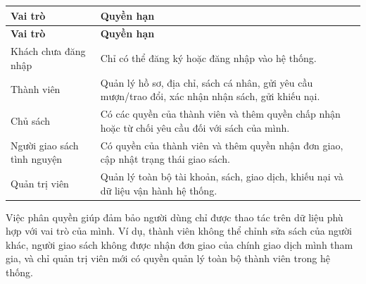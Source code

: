\begin{longtable}{L{0.28\textwidth}L{0.62\textwidth}}
    \toprule
    \textbf{Vai trò} & \textbf{Quyền hạn} \\
    \midrule
    \endfirsthead
    \toprule
    \textbf{Vai trò} & \textbf{Quyền hạn} \\
    \midrule
    \endhead
    Khách chưa đăng nhập & Chỉ có thể đăng ký hoặc đăng nhập vào hệ thống. \\
    Thành viên & Quản lý hồ sơ, địa chỉ, sách cá nhân, gửi yêu cầu mượn/trao đổi, xác nhận nhận sách, gửi khiếu nại. \\
    Chủ sách & Có các quyền của thành viên và thêm quyền chấp nhận hoặc từ chối yêu cầu đối với sách của mình. \\
    Người giao sách tình nguyện & Có quyền của thành viên và thêm quyền nhận đơn giao, cập nhật trạng thái giao sách. \\
    Quản trị viên & Quản lý toàn bộ tài khoản, sách, giao dịch, khiếu nại và dữ liệu vận hành hệ thống. \\
    \bottomrule
\end{longtable}

Việc phân quyền giúp đảm bảo người dùng chỉ được thao tác trên dữ liệu phù hợp với vai trò của mình. Ví dụ, thành viên không thể chỉnh sửa sách của người khác, người giao sách không được nhận đơn giao của chính giao dịch mình tham gia, và chỉ quản trị viên mới có quyền quản lý toàn bộ thành viên trong hệ thống.


